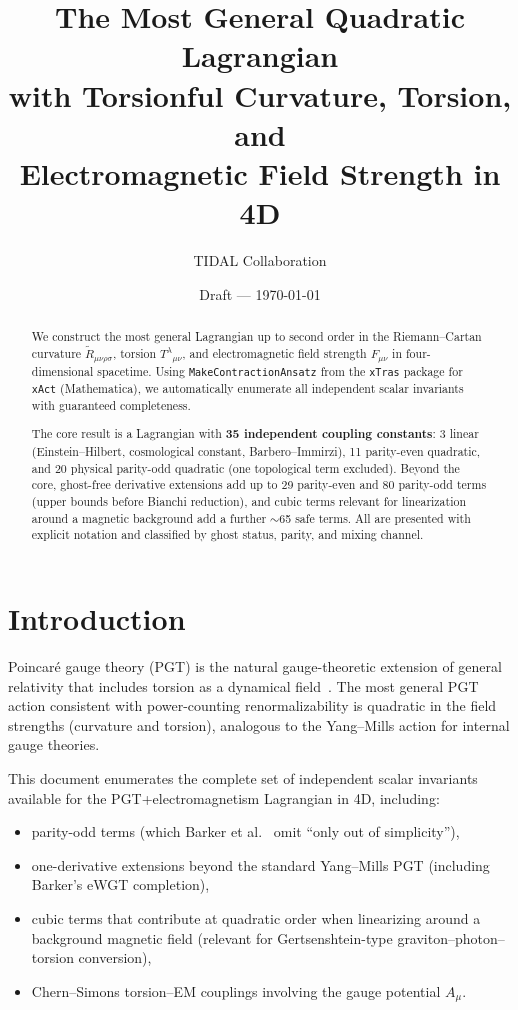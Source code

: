 \documentclass[12pt,a4paper]{article}
\title{The Most General Quadratic Lagrangian\\
  with Torsionful Curvature, Torsion, and\\
  Electromagnetic Field Strength in 4D}
\author{TIDAL Collaboration}
\date{Draft --- \today}
\newcommand{\Rt}{\tilde{R}}         %
\begin{document}
\maketitle

\begin{abstract}
We construct the most general Lagrangian up to second order in the
Riemann--Cartan curvature $\Rt_{\mu\nu\rho\sigma}$, torsion
$T^\lambda{}_{\mu\nu}$, and electromagnetic field strength
$F_{\mu\nu}$ in four-dimensional spacetime. Using
\texttt{MakeContractionAnsatz} from the \texttt{xTras} package for
\texttt{xAct} (Mathematica), we automatically enumerate all
independent scalar invariants with guaranteed completeness.

The core result is a Lagrangian with \textbf{35 independent coupling
constants}: 3 linear (Einstein--Hilbert, cosmological constant,
Barbero--Immirzi), 11 parity-even quadratic, and 20 physical
parity-odd quadratic (one topological term excluded). Beyond the core,
ghost-free derivative extensions add up to 29 parity-even and 80
parity-odd terms (upper bounds before Bianchi reduction), and
cubic terms relevant for linearization around a magnetic background
add a further $\sim$65 safe terms. All are presented with explicit
notation and classified by ghost status, parity, and mixing channel.
\end{abstract}

\tableofcontents

\section{Introduction}
\label{sec:intro}

Poincar\'e gauge theory (PGT) is the natural gauge-theoretic
extension of general relativity that includes torsion as a dynamical
field~\cite{Barker:2024ydb,Shapiro:2001rz,HayashiShirafuji}.
The most general PGT action consistent with power-counting
renormalizability is quadratic in the field strengths (curvature
and torsion), analogous to the Yang--Mills action for internal
gauge theories.

This document enumerates the complete set of independent scalar
invariants available for the PGT+electromagnetism Lagrangian in 4D,
including:
\begin{itemize}
  \item parity-odd terms (which Barker et al.~\cite{Barker:2024ydb}
    omit ``only out of simplicity''),
  \item one-derivative extensions beyond the standard Yang--Mills
    PGT (including Barker's eWGT completion),
  \item cubic terms that contribute at quadratic order when
    linearizing around a background magnetic field (relevant for
    Gertsenshtein-type graviton--photon--torsion conversion),
  \item Chern--Simons torsion--EM couplings involving the gauge
    potential $A_\mu$.
\end{itemize}
\end{document}
